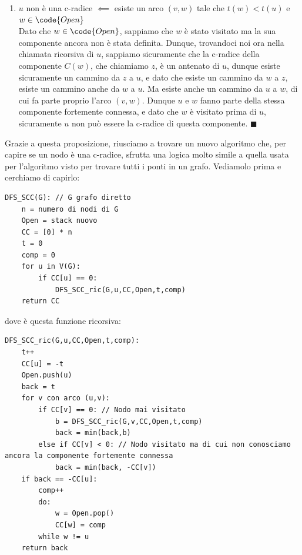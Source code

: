 \documentclass[11pt, a4paper, titlepage, oneside]{scrbook}
\begin{document}
\begin{enumerate}[label=\arabic*°]
    Possiamo quindi concludere che $t(w) < t(u)$ e che $w \in \code{Open}$. $\blacksquare$
    \item $u$ non è una c-radice $\impliedby$ esiste un arco $(v,w)$ tale che $t(w) < t(u)$ e $w \in \code{Open}$ \\
    Dato che $w \in \code{Open}$, sappiamo che $w$ è stato visitato ma la sua componente ancora non è stata definita. Dunque, trovandoci noi ora nella chiamata ricorsiva di $u$, sappiamo sicuramente che la c-radice della componente $C(w)$, che chiamiamo $z$, è un antenato di $u$, dunque esiste sicuramente un cammino da $z$ a $u$, e dato che esiste un cammino da $w$ a $z$, esiste un cammino anche da $w$ a $u$. Ma esiste anche un cammino da $u$ a $w$, di cui fa parte proprio l'arco $(v,w)$. Dunque $u$ e $w$ fanno parte della stessa componente fortemente connessa, e dato che $w$ è visitato prima di $u$, sicuramente $u$ non può essere la c-radice di questa componente. $\blacksquare$
\end{enumerate}

Grazie a questa proposizione, riusciamo a trovare un nuovo algoritmo  che, per capire se un nodo è una c-radice, sfrutta una logica molto simile a quella usata per l'algoritmo  visto per trovare tutti i ponti in un grafo. Vediamolo prima e cerchiamo di capirlo:

\begin{lstlisting}[style=Python]
DFS_SCC(G): // G grafo diretto
    n = numero di nodi di G
    Open = stack nuovo
    CC = [0] * n
    t = 0
    comp = 0
    for u in V(G):
        if CC[u] == 0:
            DFS_SCC_ric(G,u,CC,Open,t,comp)
    return CC
\end{lstlisting}

dove  è questa funzione ricorsiva:
\begin{lstlisting}[style=Python]
DFS_SCC_ric(G,u,CC,Open,t,comp):
    t++
    CC[u] = -t
    Open.push(u)
    back = t
    for v con arco (u,v):
        if CC[v] == 0: // Nodo mai visitato
            b = DFS_SCC_ric(G,v,CC,Open,t,comp)
            back = min(back,b)
        else if CC[v] < 0: // Nodo visitato ma di cui non conosciamo ancora la componente fortemente connessa
            back = min(back, -CC[v])
    if back == -CC[u]: 
        comp++
        do:
            w = Open.pop()
            CC[w] = comp
        while w != u
    return back
\end{lstlisting}
\end{document}
